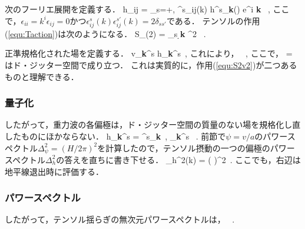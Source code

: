 次のフーリエ展開を定義する．
\beq
 h_{ij} = \int {} \sum_{s=+,\times} \epsilon^s_{ij}(k) h^s_{\bf k}(\tau) e^{i {\bf k} }\, ,
\eeq
ここで，$\epsilon_{ii} = k^i \epsilon_{ij} = 0$かつ$\epsilon^s_{ij}(k) \epsilon^{s'}_{ij}(k) = 2 \delta_{s s'}$である．
テンソルの作用(\ref{equ:Taction})は次のようになる．
\beq
S_{(2)} = \sum_s \int \d \tau \d {\bf k}  \Mp^2 \left[ h_{\bf k}^s{}' h_{\bf k}^s{}' - k^2 h_{\bf k}^s h_{\bf k}^s\right]\, .
\eeq

正準規格化された場を定義する．
\beq
v_{\bf k}^s \equiv {} \Mp h_{\bf k}^s\, ,
\eeq
これにより，
\beq
\label{equ:S2v3}
\, ,
\eeq
ここで，
\beq
{} = 
\eeq
はド・ジッター空間で成り立つ．
これは実質的に，作用(\ref{equ:S2v2})が二つあるものと理解できる．

\subsubsection{量子化}

したがって，重力波の各偏極は，ド・ジッター空間の質量のない場を規格化し直したものにほかならない．
\beq
h_{\bf k}^s =  \psi^s_{\bf k}\, , \qquad \psi_{\bf k}^s \equiv {}\, .
\eeq
前節で$\psi = v/a$のパワースペクトル$\Delta_\psi^2 = (H/2\pi)^2$を計算したので，テンソル摂動の一つの偏極のパワースペクトル$\Delta_h^2$の答えを直ちに書き下せる．
\beq
\Delta_h^2(k) =  \left( \right)^2\, .
\eeq
ここでも，右辺は地平線退出時に評価する．



\subsubsection{パワースペクトル}
したがって，テンソル揺らぎの無次元パワースペクトルは，
\beq
\label{equ:maldaPt}
\, .
\eeq


